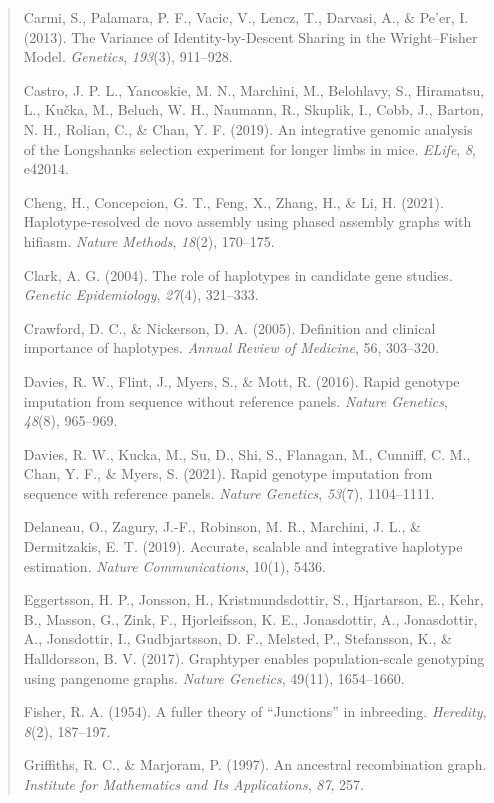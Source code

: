 \documentclass[
]{article}
\begin{document}
\begin{quote}
Carmi, S., Palamara, P. F., Vacic, V., Lencz, T., Darvasi, A., \& Pe'er,
I. (2013). The Variance of Identity-by-Descent Sharing in the
Wright--Fisher Model. \emph{Genetics}, \emph{193}(3), 911--928.

Castro, J. P. L., Yancoskie, M. N., Marchini, M., Belohlavy, S.,
Hiramatsu, L., Kučka, M., Beluch, W. H., Naumann, R., Skuplik, I., Cobb,
J., Barton, N. H., Rolian, C., \& Chan, Y. F. (2019). An integrative
genomic analysis of the Longshanks selection experiment for longer limbs
in mice. \emph{ELife}, \emph{8}, e42014.

Cheng, H., Concepcion, G. T., Feng, X., Zhang, H., \& Li, H. (2021).
Haplotype-resolved de novo assembly using phased assembly graphs with
hifiasm. \emph{Nature Methods}, \emph{18}(2), 170--175.

Clark, A. G. (2004). The role of haplotypes in candidate gene studies.
\emph{Genetic Epidemiology}, \emph{27}(4), 321--333.

Crawford, D. C., \& Nickerson, D. A. (2005). Definition and clinical
importance of haplotypes. \emph{Annual Review of Medicine}, 56,
303--320.

Davies, R. W., Flint, J., Myers, S., \& Mott, R. (2016). Rapid genotype
imputation from sequence without reference panels. \emph{Nature
Genetics}, \emph{48}(8), 965--969.

Davies, R. W., Kucka, M., Su, D., Shi, S., Flanagan, M., Cunniff, C. M.,
Chan, Y. F., \& Myers, S. (2021). Rapid genotype imputation from
sequence with reference panels. \emph{Nature Genetics}, \emph{53}(7),
1104--1111.

Delaneau, O., Zagury, J.-F., Robinson, M. R., Marchini, J. L., \&
Dermitzakis, E. T. (2019). Accurate, scalable and integrative haplotype
estimation. \emph{Nature Communications}, 10(1), 5436.

Eggertsson, H. P., Jonsson, H., Kristmundsdottir, S., Hjartarson, E.,
Kehr, B., Masson, G., Zink, F., Hjorleifsson, K. E., Jonasdottir, A.,
Jonasdottir, A., Jonsdottir, I., Gudbjartsson, D. F., Melsted, P.,
Stefansson, K., \& Halldorsson, B. V. (2017). Graphtyper enables
population-scale genotyping using pangenome graphs. \emph{Nature
Genetics}, 49(11), 1654--1660.

Fisher, R. A. (1954). A fuller theory of ``Junctions'' in inbreeding.
\emph{Heredity}, \emph{8}(2), 187--197.

Griffiths, R. C., \& Marjoram, P. (1997). An ancestral recombination
graph. \emph{Institute for Mathematics and Its Applications}, \emph{87},
257.


\end{quote}
\end{document}
